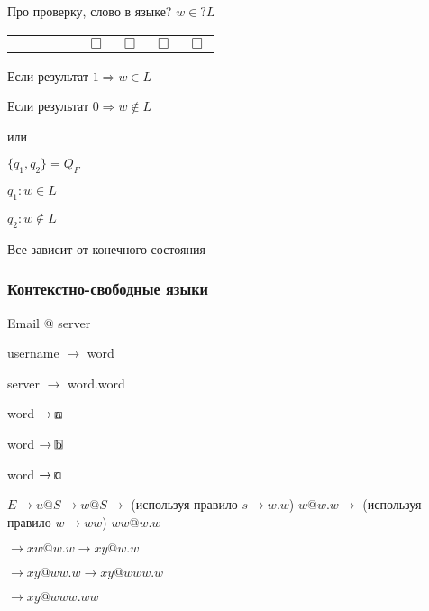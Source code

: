 \documentclass[russian]{lecture-notes}
\begin{document}
    \begin{remark}
        Про проверку, слово в языке? $w \in ? L$

        \begin{table}[H]
            \centering
            \begin{tabular}{ *{9}{c} }
                \cline{1-9}
                \multicolumn{1}{|c}{ } &
                \multicolumn{1}{|c}{ } &
                \multicolumn{1}{|c}{ } &
                \multicolumn{1}{|c}{ } &
                \multicolumn{1}{|c}{ } &
                \multicolumn{1}{|c}{$\Box$} &
                \multicolumn{1}{|c}{$\Box$} &
                \multicolumn{1}{|c}{$\Box$} &
                \multicolumn{1}{|c|}{$\Box$} \\
                \cline{1-9}
            \end{tabular}
        \end{table}

        Если результат $1 \Rightarrow w \in L$

        Если результат $0 \Rightarrow w \notin L$

        или

        $\{ q_1, q_2\} = Q_F$

        $q_1: w \in L$

        $q_2: w \notin L$

        Все зависит от конечного состояния
    \end{remark}

    \subsubsection{Контекстно-свободные языки}

    \begin{example}
        Email @ server

        username $\rightarrow$ word

        server $\rightarrow$ word.word

        word $\rightarrow \frame{a}$

        word $\rightarrow \frame{b}$

        word $\rightarrow \frame{c}$

        $E \rightarrow u@S \rightarrow w@S \rightarrow$ (используя правило $s \rightarrow w.w$) $w@w.w \rightarrow$ (используя правило $w \rightarrow ww$) $ww@w.w$

        $\rightarrow xw@w.w \rightarrow xy@w.w$

        $\rightarrow xy@ww.w \rightarrow xy@www.w$

        $\rightarrow xy@www.ww$
    \end{example}
\end{document}
